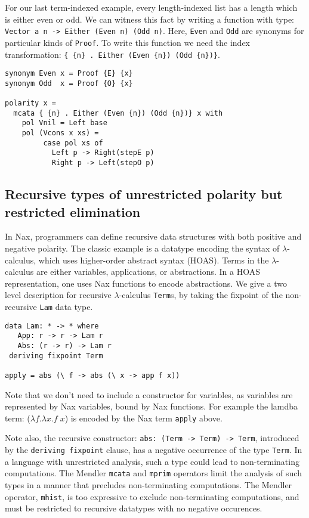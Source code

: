 {For our last term-indexed example, every length-indexed list has a length
which is either even or odd. We can witness this fact by writing a function with type:
\verb+Vector a n -> Either (Even n) (Odd n)+. Here, \verb+Even+ and \verb+Odd+
are synonyms for particular kinds of \verb+Proof+. To write this function
we need the index transformation: \verb+{ {n} . Either (Even {n}) (Odd {n})}+.

{\small
\begin{verbatim}    
synonym Even x = Proof {E} {x}
synonym Odd  x = Proof {O} {x}

polarity x = 
  mcata { {n} . Either (Even {n}) (Odd {n})} x with
    pol Vnil = Left base
    pol (Vcons x xs) = 
         case pol xs of
           Left p -> Right(stepE p)
           Right p -> Left(stepO p)  
\end{verbatim}}

\subsection{Recursive types of unrestricted polarity but restricted elimination}
\label{sec:bg:recty}
In Nax, programmers can define recursive data structures with both positive and 
negative polarity.  The classic example is a datatype
encoding the syntax of $\lambda$-calculus, which uses higher-order abstract syntax (HOAS).
Terms in the $\lambda$-calculus are either variables, applications, or abstractions.
In a HOAS representation, one uses Nax functions to encode abstractions. We
give a two level description for recursive $\lambda$-calculus \verb+Term+s, by taking
the fixpoint of the non-recursive \verb+Lam+ data type. 

{\small
\begin{verbatim}    
data Lam: * -> * where
   App: r -> r -> Lam r
   Abs: (r -> r) -> Lam r
 deriving fixpoint Term
 
apply = abs (\ f -> abs (\ x -> app f x)) 
\end{verbatim}}
Note that we don't need to include a constructor for variables,
as variables are represented by Nax variables, bound by Nax
functions. For example the lamdba term: ($\lambda f . \lambda x . f\; x$)
is encoded by the Nax term \verb+apply+ above.

Note also, the recursive constructor: \verb+abs: (Term -> Term) -> Term+,
introduced by the \verb+deriving fixpoint+ clause,
has a negative occurrence of the type \verb+Term+. In a language with
unrestricted analysis, such a type could lead to non-terminating
computations. The Mendler \verb+mcata+ and \verb+mprim+ operators
limit the analysis of such types in a manner that precludes non-terminating
computations. The Mendler operator, \verb+mhist+, is too expressive
to exclude non-terminating computations, and must be restricted to recursive
datatypes with no negative occurences.

}
